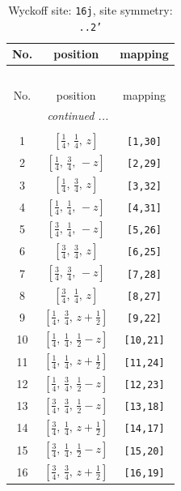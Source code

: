 \documentclass[fleqn,8pt]{jsarticle}
\begin{document}
\begin{longtable}{ccc}
\caption{Wyckoff site: {\tt 16j}, site symmetry: {\tt ..2'}}
 \\
 \hline \hline
No. & position & mapping \\ \hline \endfirsthead

\multicolumn{2}{l}{\tablename\ \thetable{}} \\
 \hline \hline
No. & position & mapping \\ \hline \endhead

 \hline \hline
\multicolumn{2}{r}{\footnotesize\it continued ...} \\ \endfoot

 \hline \hline
\multicolumn{2}{r}{} \\ \endlastfoot

1 & $\left[ \frac{1}{4},\, \frac{1}{4},\, z \right]$ & {\tt [1,30]} \\ \hline
2 & $\left[ \frac{1}{4},\, \frac{3}{4},\, - z \right]$ & {\tt [2,29]} \\ \hline
3 & $\left[ \frac{1}{4},\, \frac{3}{4},\, z \right]$ & {\tt [3,32]} \\ \hline
4 & $\left[ \frac{1}{4},\, \frac{1}{4},\, - z \right]$ & {\tt [4,31]} \\ \hline
5 & $\left[ \frac{3}{4},\, \frac{1}{4},\, - z \right]$ & {\tt [5,26]} \\ \hline
6 & $\left[ \frac{3}{4},\, \frac{3}{4},\, z \right]$ & {\tt [6,25]} \\ \hline
7 & $\left[ \frac{3}{4},\, \frac{3}{4},\, - z \right]$ & {\tt [7,28]} \\ \hline
8 & $\left[ \frac{3}{4},\, \frac{1}{4},\, z \right]$ & {\tt [8,27]} \\ \hline
9 & $\left[ \frac{1}{4},\, \frac{3}{4},\, z + \frac{1}{2} \right]$ & {\tt [9,22]} \\ \hline
10 & $\left[ \frac{1}{4},\, \frac{1}{4},\, \frac{1}{2} - z \right]$ & {\tt [10,21]} \\ \hline
11 & $\left[ \frac{1}{4},\, \frac{1}{4},\, z + \frac{1}{2} \right]$ & {\tt [11,24]} \\ \hline
12 & $\left[ \frac{1}{4},\, \frac{3}{4},\, \frac{1}{2} - z \right]$ & {\tt [12,23]} \\ \hline
13 & $\left[ \frac{3}{4},\, \frac{3}{4},\, \frac{1}{2} - z \right]$ & {\tt [13,18]} \\ \hline
14 & $\left[ \frac{3}{4},\, \frac{1}{4},\, z + \frac{1}{2} \right]$ & {\tt [14,17]} \\ \hline
15 & $\left[ \frac{3}{4},\, \frac{1}{4},\, \frac{1}{2} - z \right]$ & {\tt [15,20]} \\ \hline
16 & $\left[ \frac{3}{4},\, \frac{3}{4},\, z + \frac{1}{2} \right]$ & {\tt [16,19]} \\
\end{longtable}
\end{document}
